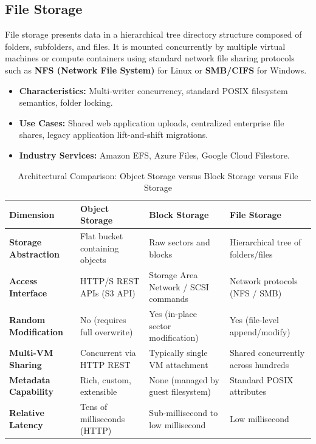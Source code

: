 \subsection{File Storage}
File storage presents data in a hierarchical tree directory structure composed of folders, subfolders, and files. It is mounted concurrently by multiple virtual machines or compute containers using standard network file sharing protocols such as \textbf{NFS (Network File System)} for Linux or \textbf{SMB/CIFS} for Windows.
\begin{itemize}
    \item \textbf{Characteristics:} Multi-writer concurrency, standard POSIX filesystem semantics, folder locking.
    \item \textbf{Use Cases:} Shared web application uploads, centralized enterprise file shares, legacy application lift-and-shift migrations.
    \item \textbf{Industry Services:} Amazon EFS, Azure Files, Google Cloud Filestore.
\end{itemize}

\begin{table}[htbp]
\centering
\small
\caption{Architectural Comparison: Object Storage versus Block Storage versus File Storage}
\label{tab:storage_types_comparison}
\begin{tabularx}{\textwidth}{lXXX}
\toprule
\textbf{Dimension} & \textbf{Object Storage} & \textbf{Block Storage} & \textbf{File Storage} \\
\midrule
\textbf{Storage Abstraction} & Flat bucket containing objects & Raw sectors and blocks & Hierarchical tree of folders/files \\
\textbf{Access Interface} & HTTP/S REST APIs (S3 API) & Storage Area Network / SCSI commands & Network protocols (NFS / SMB) \\
\textbf{Random Modification} & No (requires full overwrite) & Yes (in-place sector modification) & Yes (file-level append/modify) \\
\textbf{Multi-VM Sharing} & Concurrent via HTTP REST & Typically single VM attachment & Shared concurrently across hundreds \\
\textbf{Metadata Capability} & Rich, custom, extensible & None (managed by guest filesystem) & Standard POSIX attributes \\
\textbf{Relative Latency} & Tens of milliseconds (HTTP) & Sub-millisecond to low millisecond & Low millisecond \\
\bottomrule
\end{tabularx}
\end{table}

